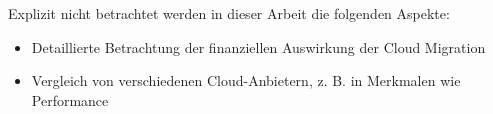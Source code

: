 Explizit nicht betrachtet werden in dieser Arbeit die folgenden Aspekte:
\begin{itemize}
\item Detaillierte Betrachtung der finanziellen Auswirkung der Cloud Migration
\item Vergleich von verschiedenen Cloud-Anbietern, z. B. in Merkmalen wie Performance
\end{itemize}

\pagebreak



